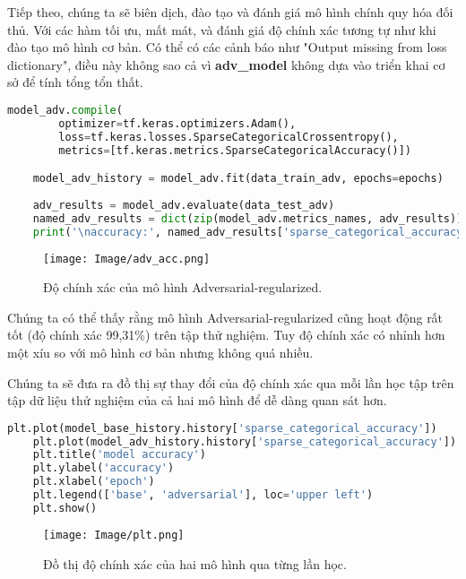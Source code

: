 Tiếp theo, chúng ta sẽ biên dịch, đào tạo và đánh giá mô hình chính quy hóa đối thủ. Với các hàm tối ưu, mất mát, và đánh giá độ chính xác tương tự như khi đào tạo mô hình cơ bản.
Có thể có các cảnh báo như "Output missing from loss dictionary", điều này không sao cả vì \textbf{adv\_model} không dựa vào triển khai cơ sở để tính tổng tổn thất.



\begin{lstlisting}[language=Python]
    model_adv.compile(
        optimizer=tf.keras.optimizers.Adam(),
        loss=tf.keras.losses.SparseCategoricalCrossentropy(),
        metrics=[tf.keras.metrics.SparseCategoricalAccuracy()])

    model_adv_history = model_adv.fit(data_train_adv, epochs=epochs)
    
    adv_results = model_adv.evaluate(data_test_adv)
    named_adv_results = dict(zip(model_adv.metrics_names, adv_results))
    print('\naccuracy:', named_adv_results['sparse_categorical_accuracy'])

\end{lstlisting}

\begin{figure}[h!]
    \centering
    \texttt{[image: Image/adv\_acc.png]}
    \caption{Độ chính xác của mô hình Adversarial-regularized.}
    \label{fig 2.3:Độ chính xác của mô hình Adversarial-regularized}
\end{figure}

Chúng ta có thể thấy rằng mô hình Adversarial-regularized cũng hoạt động rất tốt (độ chính xác 99,31\%) trên tập thử nghiệm. Tuy độ chính xác có nhỉnh hơn một xíu so với mô hình cơ bản
nhưng không quá nhiều.

Chúng ta sẽ đưa ra đồ thị sự thay đổi của độ chính xác qua mỗi lần học tập trên tập dữ liệu thử nghiệm của cả hai mô hình để dễ dàng quan sát hơn.
\begin{lstlisting}[language=Python]
    plt.plot(model_base_history.history['sparse_categorical_accuracy'])
    plt.plot(model_adv_history.history['sparse_categorical_accuracy'])
    plt.title('model accuracy')
    plt.ylabel('accuracy')
    plt.xlabel('epoch')
    plt.legend(['base', 'adversarial'], loc='upper left')
    plt.show()
\end{lstlisting}

\begin{figure}[h!]
    \centering
    \texttt{[image: Image/plt.png]}
    \caption{Đồ thị độ chính xác của hai mô hình qua từng lần học.}
    \label{fig 2.4:Đồ thị độ chính xác của hai mô hình qua từng lần học.}
    
\end{figure}

